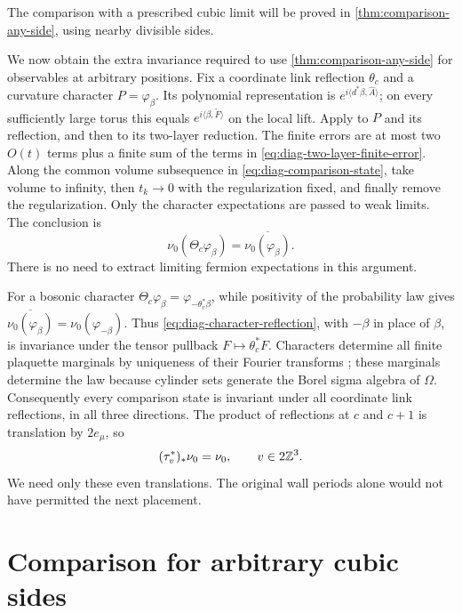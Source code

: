 The comparison with a prescribed cubic limit will be proved in
\cref{thm:comparison-any-side}, using nearby divisible sides.

We now obtain the extra invariance required to use
\cref{thm:comparison-any-side} for observables at arbitrary
positions. Fix a coordinate link reflection $\theta_c$
and a curvature character $P=\varphi_\beta$. Its polynomial
representation is $e^{i\langle d^*\beta,\widehat A\rangle}$;
on every sufficiently large torus this equals
$e^{i\langle\beta,\widetilde F\rangle}$ on the local lift.
Apply  to $P$
and its reflection, and then
 to its two-layer
reduction. The finite errors are at most two $O(t)$ terms
plus a finite sum of the terms in
\eqref{eq:diag-two-layer-finite-error}. Along the common
volume subsequence in \eqref{eq:diag-comparison-state},
take volume to infinity, then $t_k\to0$ with the regularization
fixed, and finally remove the regularization. Only the
character expectations are passed to weak limits. The
conclusion is
\begin{equation}\label{eq:diag-character-reflection}
 \nu_0(\Theta_c\varphi_\beta)
                           =\overline{\nu_0(\varphi_\beta)}.
\end{equation}
There is no need to extract limiting fermion expectations
in this argument.

For a bosonic character
$\Theta_c\varphi_\beta=\varphi_{-\theta_c^*\beta}$, while
positivity of the probability law gives
$\overline{\nu_0(\varphi_\beta)}=\nu_0(\varphi_{-\beta})$.
Thus \eqref{eq:diag-character-reflection}, with $-\beta$
in place of $\beta$, is invariance under the tensor pullback
$F\mapsto\theta_c^*F$. Characters determine all finite
plaquette marginals by uniqueness of their Fourier
transforms \cite[Theorem~6.2]{Potzelberger}; these marginals determine the law because
cylinder sets generate the Borel sigma algebra of $\Omega$.
Consequently every comparison state is invariant under
all coordinate link reflections, in all three directions.
The product of reflections at $c$ and $c+1$ is translation
by $2e_\mu$, so
\begin{equation}\label{eq:diag-even-translation}
 (\tau_v^*)_*\nu_0=\nu_0,\qquad v\in2\mathbb Z^3.
\end{equation}
We need only these even translations. The original wall
periods alone would not have permitted the next placement.

\section{Comparison for arbitrary cubic sides}\label{sec:different-sides}

